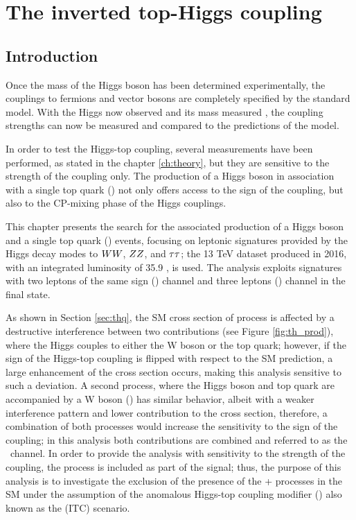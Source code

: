 \setcounter{chapter}{5}
\chapter[The inverted top-Higgs coupling]{The inverted top-Higgs coupling}\label{ch:analysis}

\section{Introduction}\label{sec:Intro_analysis}

Once the mass of the Higgs boson has been determined experimentally, the couplings to fermions and vector bosons are completely specified by the standard model. With the Higgs now observed and its mass measured \cite{h_mass}, the coupling strengths can now be measured and compared to the predictions of the model.

In order to test the Higgs-top coupling, several measurements have been performed, as stated in the chapter \ref{ch:theory}, but they are sensitive to the strength of the coupling only. The production of a Higgs boson in association with a single top quark (\tH) not only offers access to the sign of the coupling, but also to the CP-mixing phase of the Higgs couplings.

This chapter presents the search for the associated production of a Higgs boson and a single top quark (\tHq) events, focusing on leptonic signatures provided by the Higgs decay modes to $WW$, $ZZ$, and $\tau\tau$; the 13 TeV dataset produced in 2016, with an integrated luminosity of 35.9 \fbinv, is used. The analysis exploits signatures with two leptons of the same sign () channel and three leptons () channel in the final state.

As shown in Section \ref{sec:thq}, the SM cross section of \tHq process is affected by a destructive interference between two contributions (see Figure \ref{fig:th_prod}), where the Higgs couples to either the W boson or the top quark; however, if the sign of the Higgs-top coupling is flipped with respect to the SM prediction, a large enhancement of the cross section occurs, making this analysis sensitive to such a deviation. A second process, where the Higgs boson and top quark are accompanied by a W boson (\tHW) has similar behavior, albeit with a weaker interference pattern and lower contribution to the cross section, therefore, a combination of both processes would increase the sensitivity to the sign of the coupling; in this analysis both contributions are combined and referred to as the \tH\ channel. In order to provide the analysis with sensitivity to the strength of the coupling, the \ttH process is included as part of the signal; thus, the purpose of this analysis is to investigate the exclusion of the presence of the \tH + \ttH processes in the SM under the assumption of the anomalous Higgs-top coupling modifier () also known as the  (ITC) scenario. 

